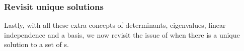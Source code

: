 


\begin{comment} 
Optionally: Gram--Schmidt (probably not here as would confuse the aims of lin indep, next section); and something on change of basis, recalling quadratics.
\end{comment}








\subsubsection{Revisit unique solutions}
Lastly, with all these extra concepts of determinants, eigenvalues,  linear independence and a basis, we now revisit the issue of when there is a unique solution to a set of s.


